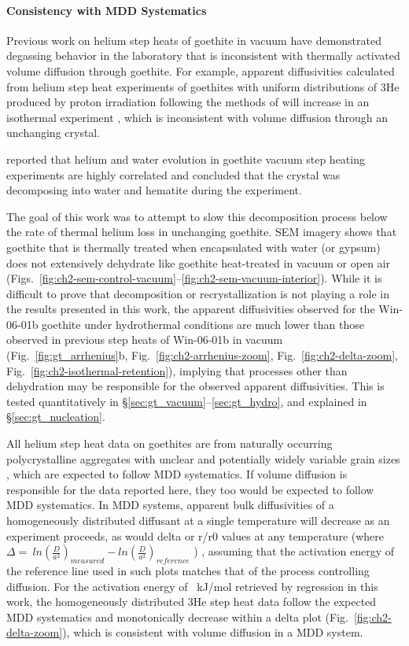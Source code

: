 \paragraph{Consistency with MDD
Systematics}\label{consistency-with-mdd-systematics}

Previous work on helium step heats of goethite in vacuum have
demonstrated degassing behavior in the laboratory that is inconsistent
with thermally activated volume diffusion through goethite. For example,
apparent diffusivities calculated from helium step heat experiments of
goethites with uniform distributions of 3He produced by proton
irradiation following the methods of \citet{shuster2004} will increase
in an isothermal experiment \citep{farley2024}, which is inconsistent
with volume diffusion through an unchanging crystal.

\citet{farley2024} reported that helium and water evolution in goethite
vacuum step heating experiments are highly correlated and concluded that
the crystal was decomposing into water and hematite during the
experiment.

The goal of this work was to attempt to slow this decomposition process
below the rate of thermal helium loss in unchanging goethite. SEM
imagery shows that goethite that is thermally treated when encapsulated
with water (or gypsum) does not extensively dehydrate like
goethite heat-treated in vacuum or open air (Figs.~\ref{fig:ch2-sem-control-vacuum}--\ref{fig:ch2-sem-vacuum-interior}). While it is
difficult to prove that decomposition or recrystallization is not
playing a role in the results presented in this work, the apparent
diffusivities observed for the Win-06-01b goethite under hydrothermal
conditions are much lower than those observed in previous step heats of
Win-06-01b in vacuum (Fig.~\ref{fig:gt_arrhenius}b, Fig.~\ref{fig:ch2-arrhenius-zoom}, Fig.~\ref{fig:ch2-delta-zoom}, Fig.~\ref{fig:ch2-isothermal-retention}), implying that
processes other than dehydration may be responsible for the observed
apparent diffusivities. This is tested quantitatively in
\S\ref{sec:gt_vacuum}--\ref{sec:gt_hydro}, and explained in \S\ref{sec:gt_nucleation}.

All helium step heat data on goethites are from naturally occurring
polycrystalline aggregates with unclear and potentially widely variable
grain sizes \citep{monteiro2017,farley2024}, which are expected to
follow MDD systematics. If volume diffusion is responsible for the data
reported here, they too would be expected to follow MDD systematics. In
MDD systems, apparent bulk diffusivities of a homogeneously distributed
diffusant at a single temperature will decrease as an experiment
proceeds, as would delta or r/r0 values at any temperature (where
\(\Delta = \ ln\left( \frac{D}{a^{2}} \right)_{measured} - ln\left( \frac{D}{a^{2}} \right)_{reference}\)
) \citep{lovera1991,farley2018}, assuming that the activation
energy of the reference line used in such plots matches that of the
process controlling diffusion. For the activation energy of \ChTwoEa{}~kJ/mol
retrieved by regression in this work, the homogeneously distributed 3He
step heat data follow the expected MDD systematics and monotonically
decrease within a delta plot (Fig.~\ref{fig:ch2-delta-zoom}), which is consistent with
volume diffusion in a MDD system.

